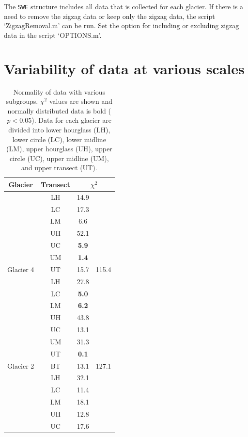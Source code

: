 \documentclass{sfuthesis}
\newcommand{\transectAbb}{Data for each glacier are divided into lower hourglass (LH), lower circle (LC), lower midline (LM), upper hourglass (UH), upper circle (UC), upper midline (UM), and upper transect (UT).}
\begin{document}
\begin{appendices}
The \texttt{SWE} structure includes all data that is collected for each glacier. If there is a need to remove the zigzag data or keep only the zigzag data, the script `ZigzagRemoval.m' can be run. Set the option for including or excluding zigzag data in the script `OPTIONS.m'.

\chapter{Variability of data at various scales}

\begin{table}
\centering
\caption{Normality of data with various subgroups. $\chi^2$ values are shown and normally distributed data is bold ($p<0.05$). \transectAbb}
\label{tab:normality}
\begin{tabular}{cccc}
\textbf{Glacier} & \textbf{Transect} & \multicolumn{2}{c}{\textbf{$\chi^2$}} \\ 
\hline
\hline 
& LH & 14.9 &   \\
  & LC & 17.3 &   \\
  & LM & 6.6 &   \\
  & UH & 52.1 &   \\
  & UC & \textbf{5.9} &   \\
& UM & \textbf{1.4} &   \\
\multirow{-7}{*}{Glacier 4} & UT & 15.7 & \multirow{-7}{*}{ 115.4} \\ \hline
 & LH & 27.8 &  \\
 & LC & \textbf{5.0} &  \\
 & LM & \textbf{6.2} &  \\
 & UH & 43.8 &  \\
 & UC & 13.1 &  \\
 & UM & 31.3 &  \\
 & UT & \textbf{0.1} &  \\
\multirow{-8}{*}{Glacier 2} & BT & 13.1 & \multirow{-8}{*}{127.1} \\ \hline
  
  & LH & 32.1 &   \\ 
  
  & LC & 11.4 &   \\
  
  & LM & 18.1 &   \\
  
  & UH & 12.8 &   \\
  
  & UC & 17.6 &   \\
  

\end{tabular}
\end{table}
\end{appendices}
\end{document}
